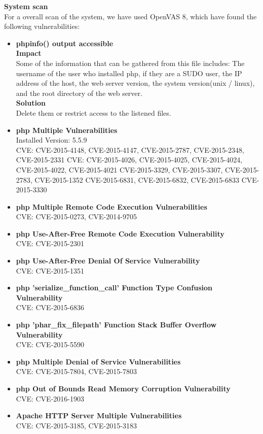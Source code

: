 \textbf{System scan}\\
For a overall scan of the system, we have used OpenVAS 8, which have found the following vulnerabilities:

\begin{itemize}
\item \textbf{phpinfo() output accessible}\\

\textbf{Impact}\\
Some of the information that can be gathered from this file includes: The username of the user who installed php, if they are a SUDO user, the IP address of the host, the web server version, the system version(unix / linux), and the root directory of the web server.\\

\textbf{Solution}\\
Delete them or restrict access to the listened files.\\

\item \textbf{php Multiple Vulnerabilities} \\
Installed Version: 5.5.9\\

CVE: CVE-2015-4148, CVE-2015-4147, CVE-2015-2787, CVE-2015-2348, CVE-2015-2331 CVE: CVE-2015-4026, CVE-2015-4025, CVE-2015-4024, CVE-2015-4022, CVE-2015-4021 CVE-2015-3329, CVE-2015-3307, CVE-2015-2783, CVE-2015-1352 CVE-2015-6831, CVE-2015-6832, CVE-2015-6833 CVE-2015-3330
\item \textbf{php Multiple Remote Code Execution Vulnerabilities} \\
CVE: CVE-2015-0273, CVE-2014-9705 
\item \textbf{php Use-After-Free Remote Code Execution Vulnerability } \\
CVE: CVE-2015-2301
\item \textbf{php Use-After-Free Denial Of Service Vulnerability} \\
CVE: CVE-2015-1351
\item \textbf{php 'serialize\_function\_call' Function Type Confusion Vulnerability} \\
CVE: CVE-2015-6836
\item \textbf{php 'phar\_fix\_filepath' Function Stack Buffer Overflow Vulnerability} \\
CVE: CVE-2015-5590
\item \textbf{php Multiple Denial of Service Vulnerabilities} \\
CVE: CVE-2015-7804, CVE-2015-7803
\item \textbf{php Out of Bounds Read Memory Corruption Vulnerability} \\
CVE: CVE-2016-1903
\item \textbf{Apache HTTP Server Multiple Vulnerabilities} \\
CVE: CVE-2015-3185, CVE-2015-3183


\end{itemize}
